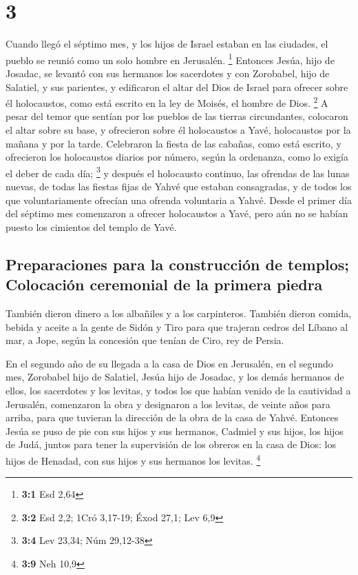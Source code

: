 \hypertarget{section-2}{%
\section{3}\label{section-2}}

 Cuando llegó el séptimo mes, y los hijos de Israel
estaban en las ciudades, el pueblo se reunió como un solo hombre en
Jerusalén. \footnote{\textbf{3:1} Esd 2,64}  Entonces
Jesúa, hijo de Josadac, se levantó con sus hermanos los sacerdotes y con
Zorobabel, hijo de Salatiel, y sus parientes, y edificaron el altar del
Dios de Israel para ofrecer sobre él holocaustos, como está escrito en
la ley de Moisés, el hombre de Dios. \footnote{\textbf{3:2} Esd 2,2;
  1Cró 3,17-19; Éxod 27,1; Lev 6,9}  A pesar del temor que
sentían por los pueblos de las tierras circundantes, colocaron el altar
sobre su base, y ofrecieron sobre él holocaustos a Yavé, holocaustos por
la mañana y por la tarde.  Celebraron la fiesta de las
cabañas, como está escrito, y ofrecieron los holocaustos diarios por
número, según la ordenanza, como lo exigía el deber de cada día;
\footnote{\textbf{3:4} Lev 23,34; Núm 29,12-38}  y después
el holocausto continuo, las ofrendas de las lunas nuevas, de todas las
fiestas fijas de Yahvé que estaban consagradas, y de todos los que
voluntariamente ofrecían una ofrenda voluntaria a Yahvé. 
Desde el primer día del séptimo mes comenzaron a ofrecer holocaustos a
Yavé, pero aún no se habían puesto los cimientos del templo de Yavé.

\hypertarget{preparaciones-para-la-construcciuxf3n-de-templos-colocaciuxf3n-ceremonial-de-la-primera-piedra}{%
\subsection{Preparaciones para la construcción de templos; Colocación
ceremonial de la primera
piedra}\label{preparaciones-para-la-construcciuxf3n-de-templos-colocaciuxf3n-ceremonial-de-la-primera-piedra}}

 También dieron dinero a los albañiles y a los
carpinteros. También dieron comida, bebida y aceite a la gente de Sidón
y Tiro para que trajeran cedros del Líbano al mar, a Jope, según la
concesión que tenían de Ciro, rey de Persia.

 En el segundo año de su llegada a la casa de Dios en
Jerusalén, en el segundo mes, Zorobabel hijo de Salatiel, Jesúa hijo de
Josadac, y los demás hermanos de ellos, los sacerdotes y los levitas, y
todos los que habían venido de la cautividad a Jerusalén, comenzaron la
obra y designaron a los levitas, de veinte años para arriba, para que
tuvieran la dirección de la obra de la casa de Yahvé. 
Entonces Jesúa se puso de pie con sus hijos y sus hermanos, Cadmiel y
sus hijos, los hijos de Judá, juntos para tener la supervisión de los
obreros en la casa de Dios: los hijos de Henadad, con sus hijos y sus
hermanos los levitas. \footnote{\textbf{3:9} Neh 10,9}

